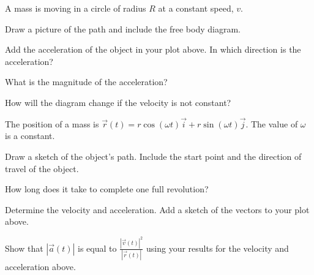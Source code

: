 
\begin{problem}
\item A mass is moving in a circle of radius $R$ at a constant speed,
  $v$.
  \begin{subproblem}
  \item Draw a picture of the path and include the free body diagram.
    \vfill
  \item Add the acceleration of the object in your plot above. In
    which direction is the acceleration?
    \vfill
  \item What is the magnitude of the acceleration?
    \vfill
  \item How will the diagram change if the velocity is not constant?
    \vfill
  \end{subproblem}
\end{problem}


\begin{problem}
\item The position of a mass is
  $\vec{r}(t)=r\cos(\omega t)\vec{i}+r\sin(\omega t)\vec{j}$. The
  value of $\omega$ is a constant.
  \begin{subproblem}
  \item Draw a sketch of the object's path. Include the start point
    and the direction of travel of the object.
    \vfill
  \item How long does it take to complete one full revolution?
    \vspace{3em}
  \item Determine the velocity and acceleration. Add a sketch of the
    vectors to your plot above.
    \vfill
  \item Show that $|\vec{a}(t)|$ is equal to
    $\frac{|\vec{v}(t)|^2}{|\vec{r}(t)|}$ using your results for the
    velocity and acceleration above.
    \vfill
  \end{subproblem}
\end{problem}

